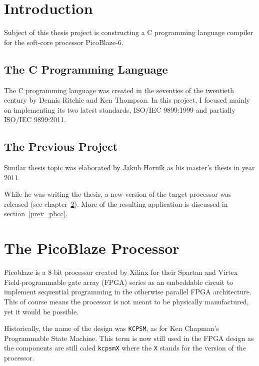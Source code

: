 
\chapter{Introduction}\label{introduction}

Subject of this thesis project is constructing a C programming language compiler for the soft-core processor PicoBlaze-6.

    \section{The C Programming Language}


    The C programming language was created in the seventies %
    of the twentieth century by Dennis Ritchie and Ken Thompson. In this project, I focused mainly on implementing its two latest standards, ISO/IEC 9899:1999 and partially ISO/IEC 9899:2011.

    \section{The Previous Project}
    Similar thesis topic was elaborated by Jakub Horník as his %
    master's thesis in year 2011.

    While he was writing the thesis, a new version of the target processor was released (see chapter~\ref{processor}). More of the resulting application is discussed in section~\ref{prev_pbcc}.

\chapter{The PicoBlaze Processor}\label{processor}

Picoblaze is a 8-bit processor created by Xilinx for their Spartan and Virtex Field-programmable gate array (FPGA) series as an embeddable circuit to implement sequential programming in the otherwise parallel FPGA architecture. This of course means the processor is not meant to be physically manufactured, yet it would be possible.

Historically, the name of the design was \texttt{KCPSM}, as for Ken Chapman's Programmable State Machine. This term is now still used in the FPGA design as the components are still caled \texttt{kcpsmX} where the \texttt{X} stands for the version of the processor.

